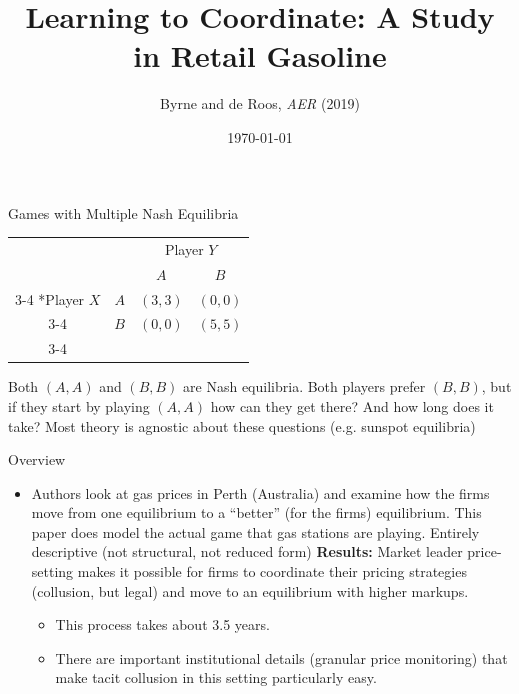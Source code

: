 \documentclass[dvipsnames]{beamer}
\title{Learning to Coordinate: A Study in Retail Gasoline}
\author{Byrne and de Roos, \emph{AER} (2019)}
\date{\today}
\begin{document}
\maketitle
\begin{frame}{Games with Multiple Nash Equilibria}
    \begin{table}
    \setlength{\extrarowheight}{2pt}
    \begin{tabular}{cc|c|c|}
      & \multicolumn{1}{c}{} & \multicolumn{2}{c}{Player $Y$}\\
      & \multicolumn{1}{c}{} & \multicolumn{1}{c}{$A$}  & \multicolumn{1}{c}{$B$} \\\cline{3-4}
      \multirow{2}*{Player $X$}  & $A$ & $(3, 3)$ & $(0,0)$ \\\cline{3-4}
      & $B$ & $(0,0)$ & $(5,5)$ \\\cline{3-4}
    \end{tabular}
  \end{table}
  \begin{itemize}
  \vitem Both $(A, A)$ and $(B, B)$ are Nash equilibria.
    \vitem Both players prefer $(B, B)$, but if they start by playing $(A, A)$ how can they get there? And how long does it take?
    \vitem Most theory is agnostic about these questions (e.g. sunspot equilibria)
  \end{itemize}
\end{frame}
  \begin{frame}{Overview}
    \begin{itemize}
      \item Authors look at gas prices in Perth (Australia) and examine how the firms move from one equilibrium to a ``better'' (for the firms) equilibrium.
    \vitem This paper does  model the actual game that gas stations are playing. Entirely descriptive (not structural, not reduced form)
      \vitem \textbf{Results:} Market leader price-setting makes it possible for firms to coordinate their pricing strategies (collusion, but legal) and move to an equilibrium with higher markups.
      \begin{itemize}
      \item This process takes about 3.5 years.
        \item There are important institutional details (granular price monitoring) that make tacit collusion in this setting particularly easy.
      \end{itemize}
    \end{itemize}
  \end{frame}
\end{document}

